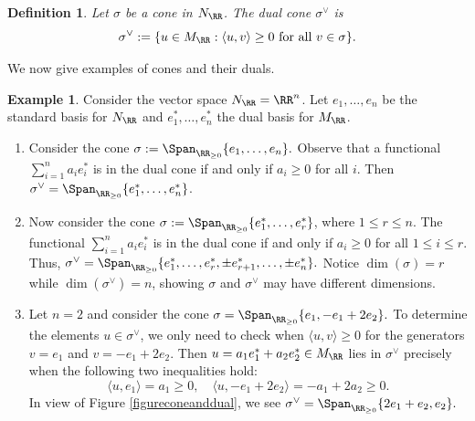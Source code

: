 \documentclass[12pt]{amsart}
\theoremstyle{plain}
\newtheorem{definition}[theorem]{Definition}
\theoremstyle{definition}
\newtheorem{example}[theorem]{Example}
\begin{document}
\begin{definition}
Let $\sigma$ be a cone in $N_\RR$.
The dual cone $\sigma^\vee$ is
$$\sigma^\vee := \{u \in M_\RR : \langle u, v \rangle \ge 0 \text{ for all } v \in \sigma\}.$$
\end{definition}

We now give examples of cones and their duals.

\begin{example}\label{example:conesandduals}
Consider the vector space $N_\RR = \RR^n$.
Let $e_1, \ldots, e_n$ be the standard basis for $N_\RR$ and $e_1^*, \ldots, e_n^*$ the dual basis for $M_\RR$.
\begin{enumerate}
\item
Consider the cone $\sigma := \Span_{\RR_{\ge 0}}\{e_1, \ldots, e_n\}.$
Observe that a functional $\sum_{i=1}^n a_i e_i^*$ is in the dual cone if and only if $a_i \ge 0$ for all $i$.
Then $\sigma^\vee = \Span_{\RR_{\ge 0}}\{e_1^*, \ldots, e_n^*\}$.

\item
Now consider the cone $\sigma := \Span_{\RR_{\ge 0}}\{e_1^*, \ldots, e_r^*\}$, where $1 \le r \le n$.
The functional $\sum_{i=1}^n a_i e_i^*$ is in the dual cone if and only if $a_i \ge 0$ for all $1 \le i \le r$.
Thus, $\sigma^\vee = \Span_{\RR_{\ge 0}}\{e_1^*, \ldots, e_r^*, \pm e_{r+1}^*, \ldots, \pm e_n^*\}.$
Notice $\dim(\sigma)=r$ while $\dim(\sigma^\vee) = n$, showing $\sigma$ and $\sigma^\vee$ may have different dimensions.

\item
Let $n = 2$ and consider the cone $\sigma = \Span_{\RR_{\ge 0}} \{e_1, - e_1 + 2 e_2\}.$
To determine the elements $u\in\sigma^\vee$, we only need to check when $\langle u, v \rangle \ge 0$ for the generators $v = e_1$ and $v = -e_1 + 2 e_2$.
Then $u = a_1 e_1^* + a_2 e_2^* \in M_\RR$ lies in $\sigma^\vee$ precisely when the following two inequalities hold:
$$\langle u, e_1 \rangle = a_1 \ge 0, \quad \langle u, -e_1 + 2e_2 \rangle = -a_1 + 2a_2 \ge 0.$$
In view of Figure \ref{figureconeanddual}, we see  $\sigma^\vee = \Span_{\RR_{\ge 0}} \{2 e_1 + e_2, e_2\}.$
\end{enumerate}
\end{example}
\end{document}
